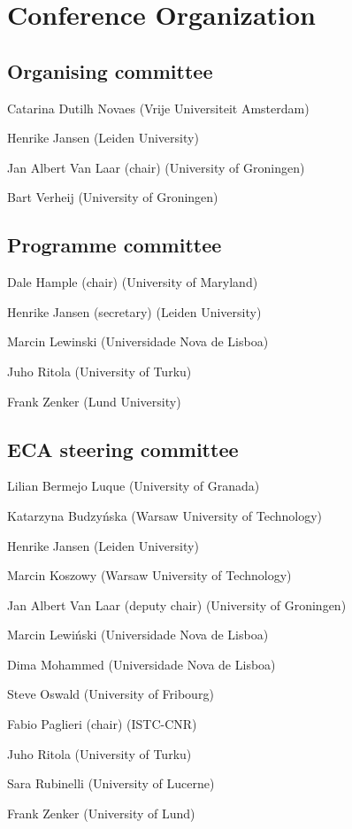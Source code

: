 \newpage

\section*{Conference Organization}
	\subsection*{Organising committee}
	\begin{compactitem}[]
		\item[] Catarina Dutilh Novaes (Vrije Universiteit Amsterdam)
		\item[] Henrike Jansen (Leiden University)
		\item[] Jan Albert Van Laar (chair) (University of Groningen)
		\item[] Bart Verheij (University of Groningen)
	\end{compactitem}

	\subsection*{Programme committee}
	\begin{compactitem}[]
		\item[] Dale Hample (chair) (University of Maryland)
		\item[] Henrike Jansen (secretary) (Leiden University)
		\item[] Marcin Lewinski (Universidade Nova de Lisboa)
		\item[] Juho Ritola (University of Turku)
		\item[] Frank Zenker (Lund University)
 	\end{compactitem}

 	\subsection*{ECA steering committee}
 	\begin{compactitem}[]
		\item[] Lilian Bermejo Luque (University of Granada)
		\item[] Katarzyna Budzyńska (Warsaw University of Technology)
		\item[] Henrike Jansen (Leiden University)
		\item[] Marcin Koszowy (Warsaw University of Technology)
		\item[] Jan Albert Van Laar (deputy chair) (University of Groningen)
		\item[] Marcin Lewiński (Universidade Nova de Lisboa)
		\item[] Dima Mohammed (Universidade Nova de Lisboa)
		\item[] Steve Oswald (University of Fribourg)
		\item[] Fabio Paglieri (chair) (ISTC-CNR)
		\item[] Juho Ritola (University of Turku)
		\item[] Sara Rubinelli (University of Lucerne)
		\item[] Frank Zenker (University of Lund)
	\end{compactitem}


